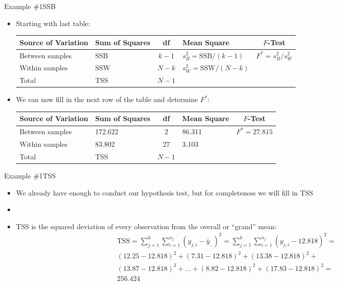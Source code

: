 \documentclass[xcolor=dvipsnames]{beamer}
\begin{document}
\begin{frame}{Example \#1}{SSB}
	\begin{itemize}
		\item Starting with last table: \pause
		\vspace{2mm}
		\begin{center}
			{\scriptsize
				\begin{tabular}{lp{1.2cm}cp{2.5cm}c}
					\hline 
					\textbf{Source of Variation} & \textbf{Sum of Squares} & \textbf{df} & \textbf{Mean Square} & $F$-\textbf{Test} \\ \hline 
					Between samples & SSB & $k - 1$ & $s_B^2 = \text{SSB} / (k-1)$ & $F^* = s_B^2 / s_W^2$ \\
					Within samples & SSW & $N - k$ &  $s_W^2 = \text{SSW} / (N-k)$ & \\
					Total & TSS & $N-1$ & & \\ \hline
			\end{tabular}}
		\end{center}\pause
		\vspace{5mm}
		\item We can now fill in the next row of the table and determine $F^*$: \pause
		\vspace{2mm}
		\begin{center}
			{\scriptsize
				\begin{tabular}{lp{1.2cm}cp{2.5cm}c}
					\hline 
					\textbf{Source of Variation} & \textbf{Sum of Squares} & \textbf{df} & \textbf{Mean Square} & $F$-\textbf{Test} \\ \hline 
					Between samples & 172.622 & 2 & 86.311 & $F^*=27.815$ \\
					Within samples & 83.802 & 27 &  3.103 & \\
					Total & TSS & $N-1$ & & \\ \hline
			\end{tabular}}
		\end{center}
	\end{itemize}
\end{frame}

\begin{frame}{Example \#1}{TSS}
	\begin{itemize}
		\item We already have enough to conduct our hypothesis test, but for completeness we will fill in TSS \pause
		\item[]
		\item TSS is the squared deviation of every observation from the overall or ``grand'' mean: \pause
		\begin{gather*}
		\text{TSS} = \sum_{j=1}^{k} \sum_{i = 1}^{n_j}\left(y_{j,i} - \bar{y}_{..}\right)^2 = \sum_{j=1}^{k} \sum_{i = 1}^{n_j}\left(y_{j,i} - 12.818\right)^2 = \\
		(12.25 - 12.818)^2 + (7.31 - 12.818)^2 + (13.38 - 12.818)^2 + \\(13.87 - 12.818)^2 + \hdots + (8.82 - 12.818)^2 + (17.83 - 12.818)^2 =\\
		256.424
		\end{gather*}
	\end{itemize}
\end{frame}
\end{document}
